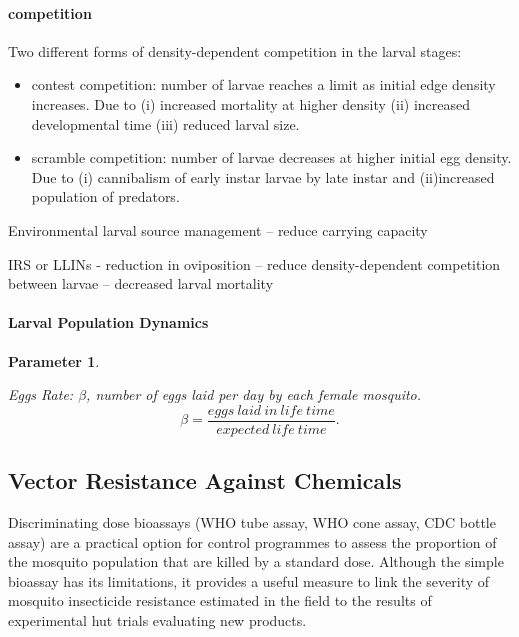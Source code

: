 \documentclass[a4paper, 12pt, twoside]{article}
\newtheorem{parameter}{Parameter}
\begin{document}
\paragraph{competition}%
\label{par:competition}
Two different forms of density-dependent competition in the larval stages:

\begin{itemize}
	\item contest competition: number of larvae reaches a limit as initial edge density increases. Due to (i) increased mortality at higher density (ii) increased developmental time (iii) reduced larval size.
	\item scramble competition: number of larvae decreases at higher initial egg density. Due to (i) cannibalism of early instar larvae by late instar and (ii)increased population of predators.
\end{itemize}

Environmental larval source management -- reduce carrying capacity

IRS or LLINs - reduction in oviposition -- reduce density-dependent competition between larvae -- decreased larval mortality

\paragraph{Larval Population Dynamics}%
\label{par:larval_population_dynamics}

\begin{parameter}
	\label{para:eggs_laid_per_day}

	Eggs Rate: $\beta$, number of eggs laid per day by each female mosquito.
	\[
		\beta=\frac{eggs\:laid\:in\:life\:time}{expected\:life\:time}
		.\]

\end{parameter}

\subsection{Vector Resistance Against Chemicals}

Discriminating dose bioassays (WHO tube assay, WHO cone assay, CDC bottle assay) are a practical option for control programmes to assess the proportion of the mosquito population that are killed by a standard dose.
Although the simple bioassay has its limitations, it provides a useful measure to link the severity of mosquito insecticide resistance estimated in the field to the results of experimental hut trials evaluating new products.
\end{document}
